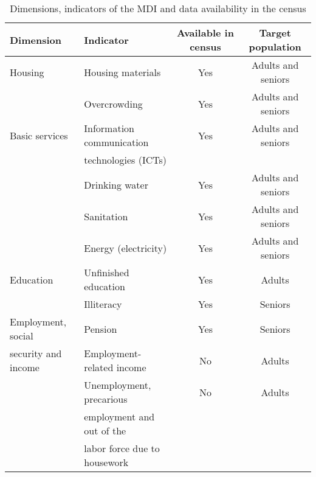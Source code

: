 \documentclass[a4paper, 11pt]{article}
\begin{document}
\begin{table}[ht]
\begin{center}
\small{
	\caption{Dimensions, indicators of the MDI and data availability in the census}
	\centering
		\begin{tabular}{llcc}
		\hline
				Dimension &Indicator&Available in census &Target population  \\
				\hline
	Housing &Housing materials & Yes & Adults and seniors\\
	& Overcrowding & Yes & Adults and seniors \\
			\hline
	Basic services &  Information communication & Yes & Adults and seniors \\
	 & technologies (ICTs) & &\\
	& Drinking water & Yes & Adults and seniors \\
	& Sanitation & Yes & Adults and seniors \\
	&Energy (electricity) & Yes & Adults and seniors \\
			\hline
	Education & Unfinished education & Yes &Adults \\
	             & Illiteracy& Yes & Seniors \\
	             		\hline
	  Employment, social  & Pension & Yes & Seniors \\
	  security and income & Employment-related income & No &Adults \\
	   & Unemployment, precarious  & No & Adults\\
	   & employment and out of the &&\\
	   &labor force due to housework&&\\
		

			\hline
	\end{tabular}
	}
	\end{center}
\end{table}

\end{document}
